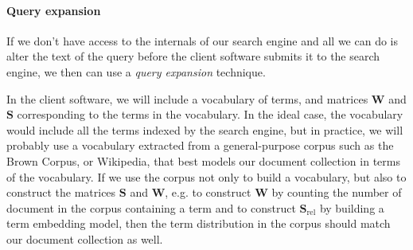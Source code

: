 \documentclass[
  digital, %
  notable, %
  lof,     %
  lot,     %
  nopalatino, color
]{fithesis3}
\let\term\emph
\let\emph=\textit
\begin{document}
\paragraph{Query expansion}
If we don't have access to the internals of our search engine and all we can do
is alter the text of the query before the client software submits it to the
search engine, we then can use a \term{query expansion} technique.

In the client software, we will include a vocabulary of terms, and matrices
$\mathbf W$ and $\mathbf S$ corresponding
to the terms in the vocabulary. In the ideal case, the vocabulary would include
all the terms indexed by the search engine, but in practice, we will probably
use a vocabulary extracted from a general-purpose corpus such as the Brown
Corpus, or Wikipedia, that best models our document collection in terms of
the vocabulary. If we use the corpus not only to build a vocabulary, but also
to construct the matrices $\mathbf S$ and $\mathbf
W$, e.g. to construct $\mathbf W$ by counting the number of
document in the corpus containing a term and to construct $\mathbf
S_{\textrm{rel}}$ by building a
term embedding model, then the term distribution in the
corpus should match our document collection as well.
\end{document}
